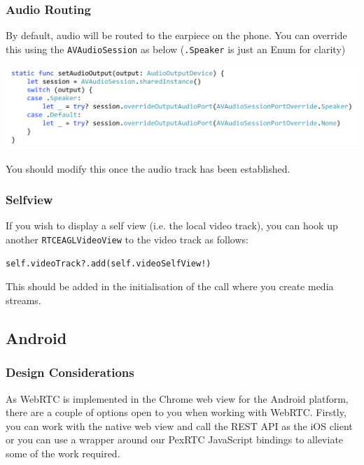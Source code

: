 \documentclass[a4paper,11pt]{article}
\begin{document}
\subsubsection{Audio Routing}
\label{sec:orgheadline56}
By default, audio will be routed to the earpiece on the phone.  You
can override this using the \texttt{AVAudioSession} as below (\texttt{.Speaker} is
just an Enum for clarity)

\includegraphics[width=.9\linewidth]{./images/audio_routing_swift.png}

You should modify this once the audio track has been established.

\subsubsection{Selfview}
\label{sec:orgheadline57}
If you wish to display a self view (i.e. the local video track), you
can hook up another \texttt{RTCEAGLVideoView} to the video track as follows:

\begin{verbatim}
self.videoTrack?.add(self.videoSelfView!)
\end{verbatim}

This should be added in the initialisation of the call where you
create media streams.

\subsection{Android}
\label{sec:orgheadline69}

\subsubsection{Design Considerations}
\label{sec:orgheadline61}

\label{orgtarget2}

As WebRTC is implemented in the Chrome web view for the Android
platform, there are a couple of options open to you when working with
WebRTC.  Firstly, you can work with the native web view and call the
REST API as the iOS client or you can use a wrapper around our PexRTC
JavaScript bindings to alleviate some of the work required.
\end{document}

